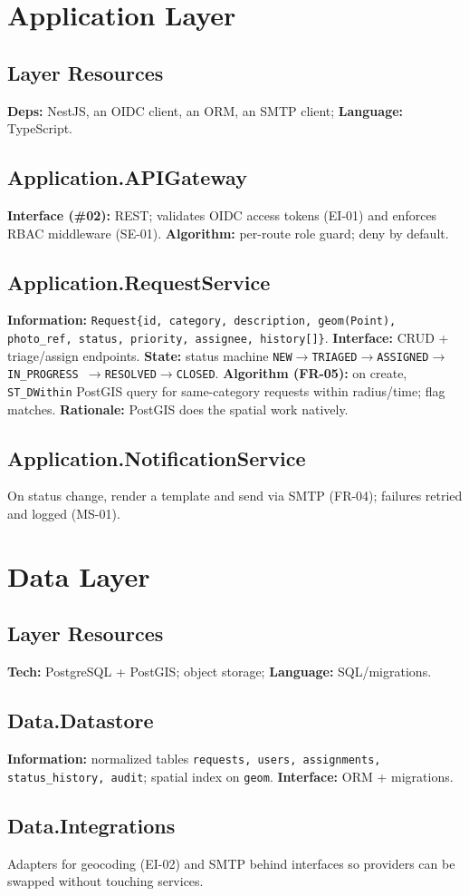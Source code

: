 \documentclass[11pt,letterpaper]{article}
\begin{document}
\section{Application Layer}
\subsection{Layer Resources}
\textbf{Deps:} NestJS, an OIDC client, an ORM, an SMTP client; \textbf{Language:}
TypeScript.
\subsection{Application.APIGateway}
\textbf{Interface (\#02):} REST; validates OIDC access tokens (EI-01) and enforces
RBAC middleware (SE-01). \textbf{Algorithm:} per-route role guard; deny by default.
\subsection{Application.RequestService}
\textbf{Information:} \texttt{Request\{id, category, description, geom(Point),
photo\_ref, status, priority, assignee, history[]\}}. \textbf{Interface:} CRUD +
triage/assign endpoints. \textbf{State:} status machine
\texttt{NEW$\rightarrow$TRIAGED$\rightarrow$ASSIGNED$\rightarrow$IN\_PROGRESS
$\rightarrow$RESOLVED$\rightarrow$CLOSED}. \textbf{Algorithm (FR-05):} on create,
\texttt{ST\_DWithin} PostGIS query for same-category requests within radius/time;
flag matches. \textbf{Rationale:} PostGIS does the spatial work natively.
\subsection{Application.NotificationService}
On status change, render a template and send via SMTP (FR-04); failures retried and
logged (MS-01).

\section{Data Layer}
\subsection{Layer Resources}
\textbf{Tech:} PostgreSQL + PostGIS; object storage; \textbf{Language:} SQL/migrations.
\subsection{Data.Datastore}
\textbf{Information:} normalized tables \texttt{requests, users, assignments,
status\_history, audit}; spatial index on \texttt{geom}. \textbf{Interface:} ORM +
migrations. \subsection{Data.Integrations}
Adapters for geocoding (EI-02) and SMTP behind interfaces so providers can be
swapped without touching services.
\end{document}
